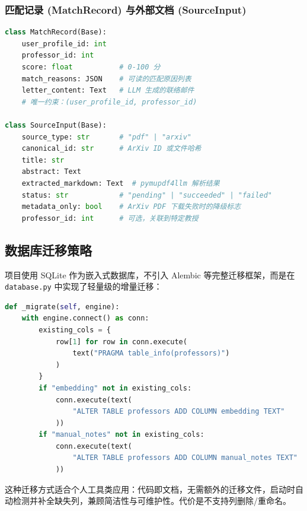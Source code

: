 \documentclass[11pt]{article}
\begin{document}
\subsubsection{匹配记录 (MatchRecord) 与外部文档 (SourceInput)}

\begin{lstlisting}[language=Python, caption=MatchRecord 与 SourceInput]
class MatchRecord(Base):
    user_profile_id: int
    professor_id: int
    score: float           # 0-100 分
    match_reasons: JSON    # 可读的匹配原因列表
    letter_content: Text   # LLM 生成的联络邮件
    # 唯一约束：(user_profile_id, professor_id)

class SourceInput(Base):
    source_type: str       # "pdf" | "arxiv"
    canonical_id: str      # ArXiv ID 或文件哈希
    title: str
    abstract: Text
    extracted_markdown: Text  # pymupdf4llm 解析结果
    status: str            # "pending" | "succeeded" | "failed"
    metadata_only: bool    # ArXiv PDF 下载失败时的降级标志
    professor_id: int      # 可选，关联到特定教授
\end{lstlisting}

\subsection{数据库迁移策略}

项目使用 SQLite 作为嵌入式数据库，不引入 Alembic 等完整迁移框架，而是在 \texttt{database.py} 中实现了轻量级的增量迁移：

\begin{lstlisting}[language=Python, caption=轻量级列迁移示例]
def _migrate(self, engine):
    with engine.connect() as conn:
        existing_cols = {
            row[1] for row in conn.execute(
                text("PRAGMA table_info(professors)")
            )
        }
        if "embedding" not in existing_cols:
            conn.execute(text(
                "ALTER TABLE professors ADD COLUMN embedding TEXT"
            ))
        if "manual_notes" not in existing_cols:
            conn.execute(text(
                "ALTER TABLE professors ADD COLUMN manual_notes TEXT"
            ))
\end{lstlisting}

\begin{keypoint}
这种迁移方式适合个人工具类应用：代码即文档，无需额外的迁移文件，启动时自动检测并补全缺失列，兼顾简洁性与可维护性。代价是不支持列删除/重命名。
\end{keypoint}

\end{document}
